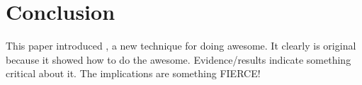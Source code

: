 \section{Conclusion}
  
  This paper introduced \system, a new technique for doing
  awesome.
  It clearly is original because it showed how to do the
  awesome.
  Evidence/results indicate something critical about it.
  The implications are something FIERCE!
